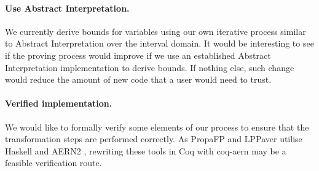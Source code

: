 \documentclass[runningheads]{llncs}
\begin{document}
\paragraph*{Use Abstract Interpretation.}
We currently derive bounds for variables using our own iterative process similar to Abstract Interpretation over the interval domain.
It would be interesting to see if the proving process would improve if we use an established Abstract Interpretation implementation to derive bounds.
If nothing else, such change would reduce the amount of new code that a user would need to trust.



\paragraph*{Verified implementation.}

We would like to formally verify some elements of our process to ensure that the transformation steps are performed correctly.
As PropaFP and LPPaver utilise Haskell and AERN2 \cite{noauthor_aern2_nodate}, rewriting these tools in Coq with coq-aern \cite{konecny_axiomatic_2021} may be a feasible verification route.


%
%


\end{document}
